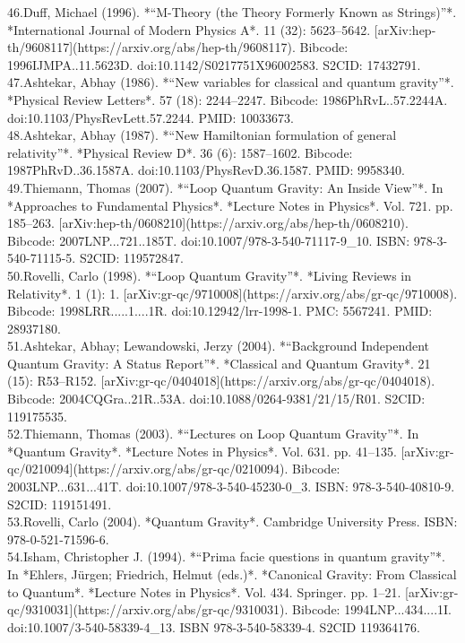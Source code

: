 46.Duff, Michael (1996). *“M-Theory (the Theory Formerly Known as Strings)”*. *International Journal of Modern Physics A*. 11 (32): 5623–5642. [arXiv:hep-th/9608117](https://arxiv.org/abs/hep-th/9608117). Bibcode: 1996IJMPA..11.5623D. doi:10.1142/S0217751X96002583. S2CID: 17432791.\\
47.Ashtekar, Abhay (1986). *“New variables for classical and quantum gravity”*. *Physical Review Letters*. 57 (18): 2244–2247. Bibcode: 1986PhRvL..57.2244A. doi:10.1103/PhysRevLett.57.2244. PMID: 10033673.\\
48.Ashtekar, Abhay (1987). *“New Hamiltonian formulation of general relativity”*. *Physical Review D*. 36 (6): 1587–1602. Bibcode: 1987PhRvD..36.1587A. doi:10.1103/PhysRevD.36.1587. PMID: 9958340.\\
49.Thiemann, Thomas (2007). *“Loop Quantum Gravity: An Inside View”*. In *Approaches to Fundamental Physics*. *Lecture Notes in Physics*. Vol. 721. pp. 185–263. [arXiv:hep-th/0608210](https://arxiv.org/abs/hep-th/0608210). Bibcode: 2007LNP...721..185T. doi:10.1007/978-3-540-71117-9_10. ISBN: 978-3-540-71115-5. S2CID: 119572847.\\
50.Rovelli, Carlo (1998). *“Loop Quantum Gravity”*. *Living Reviews in Relativity*. 1 (1): 1. [arXiv:gr-qc/9710008](https://arxiv.org/abs/gr-qc/9710008). Bibcode: 1998LRR.....1....1R. doi:10.12942/lrr-1998-1. PMC: 5567241. PMID: 28937180.\\
51.Ashtekar, Abhay; Lewandowski, Jerzy (2004). *“Background Independent Quantum Gravity: A Status Report”*. *Classical and Quantum Gravity*. 21 (15): R53–R152. [arXiv:gr-qc/0404018](https://arxiv.org/abs/gr-qc/0404018). Bibcode: 2004CQGra..21R..53A. doi:10.1088/0264-9381/21/15/R01. S2CID: 119175535.\\
52.Thiemann, Thomas (2003). *“Lectures on Loop Quantum Gravity”*. In *Quantum Gravity*. *Lecture Notes in Physics*. Vol. 631. pp. 41–135. [arXiv:gr-qc/0210094](https://arxiv.org/abs/gr-qc/0210094). Bibcode: 2003LNP...631...41T. doi:10.1007/978-3-540-45230-0_3. ISBN: 978-3-540-40810-9. S2CID: 119151491.\\
53.Rovelli, Carlo (2004). *Quantum Gravity*. Cambridge University Press. ISBN: 978-0-521-71596-6.\\
54.Isham, Christopher J. (1994). *“Prima facie questions in quantum gravity”*. In *Ehlers, Jürgen; Friedrich, Helmut (eds.)*. *Canonical Gravity: From Classical to Quantum*. *Lecture Notes in Physics*. Vol. 434. Springer. pp. 1–21. [arXiv:gr-qc/9310031](https://arxiv.org/abs/gr-qc/9310031). Bibcode: 1994LNP...434....1I. doi:10.1007/3-540-58339-4_13. ISBN 978-3-540-58339-4. S2CID 119364176.\\
